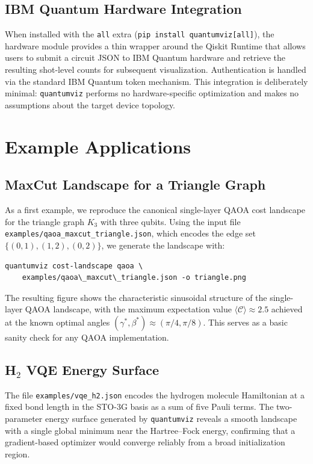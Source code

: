 \documentclass{SciPost}
\begin{document}
\subsection{IBM Quantum Hardware Integration}

When installed with the \texttt{all} extra
(\texttt{pip install quantumviz[all]}), the hardware module provides a thin
wrapper around the Qiskit Runtime that allows users to submit a circuit JSON
to IBM Quantum hardware and retrieve the resulting shot-level counts for
subsequent visualization.
Authentication is handled via the standard IBM Quantum token mechanism.
This integration is deliberately minimal: \texttt{quantumviz} performs no
hardware-specific optimization and makes no assumptions about the target
device topology.

\section{Example Applications}
\label{sec:examples}

\subsection{MaxCut Landscape for a Triangle Graph}

As a first example, we reproduce the canonical single-layer QAOA cost
landscape for the triangle graph $K_3$ with three qubits.
Using the input file \texttt{examples/qaoa\_maxcut\_triangle.json}, which
encodes the edge set $\{(0,1),(1,2),(0,2)\}$, we generate the landscape with:
\begin{lstlisting}
quantumviz cost-landscape qaoa \
    examples/qaoa\_maxcut\_triangle.json -o triangle.png
\end{lstlisting}

The resulting figure shows the characteristic sinusoidal structure of the
single-layer QAOA landscape, with the maximum expectation value
$\langle \mathcal{C}\rangle \approx 2.5$ achieved at the known optimal angles
$(\gamma^*,\beta^*) \approx (\pi/4, \pi/8)$.
This serves as a basic sanity check for any QAOA implementation.

\subsection{H$_2$ VQE Energy Surface}

The file \texttt{examples/vqe\_h2.json} encodes the hydrogen molecule
Hamiltonian at a fixed bond length in the STO-3G basis as a sum of five
Pauli terms.
The two-parameter energy surface generated by \texttt{quantumviz} reveals a
smooth landscape with a single global minimum near the Hartree--Fock energy,
confirming that a gradient-based optimizer would converge reliably from a
broad initialization region.
\end{document}
